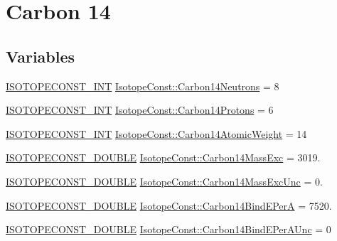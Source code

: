 \hypertarget{group___isotope_const-_carbon-_c14}{}\section{Carbon 14}
\label{group___isotope_const-_carbon-_c14}
\subsection*{Variables}
\begin{DoxyCompactItemize}
\item 
\mbox{\hyperlink{group___isotope_const-_macros_ga5f18360b3e99483a35c32d789e62621c}{I\+S\+O\+T\+O\+P\+E\+C\+O\+N\+S\+T\+\_\+\+I\+NT}} \mbox{\hyperlink{group___isotope_const-_carbon-_c14_ga27dacc948f6ae06a5991ff37f7dabc4e}{Isotope\+Const\+::\+Carbon14\+Neutrons}} = 8
\item 
\mbox{\hyperlink{group___isotope_const-_macros_ga5f18360b3e99483a35c32d789e62621c}{I\+S\+O\+T\+O\+P\+E\+C\+O\+N\+S\+T\+\_\+\+I\+NT}} \mbox{\hyperlink{group___isotope_const-_carbon-_c14_gaa3de74dac29f99d58605443dff6628bf}{Isotope\+Const\+::\+Carbon14\+Protons}} = 6
\item 
\mbox{\hyperlink{group___isotope_const-_macros_ga5f18360b3e99483a35c32d789e62621c}{I\+S\+O\+T\+O\+P\+E\+C\+O\+N\+S\+T\+\_\+\+I\+NT}} \mbox{\hyperlink{group___isotope_const-_carbon-_c14_ga43cebc563dcf6e3277e051b9c78b7fba}{Isotope\+Const\+::\+Carbon14\+Atomic\+Weight}} = 14
\item 
\mbox{\hyperlink{group___isotope_const-_macros_ga8f45a7272ce02c0b4c65c44636ed719a}{I\+S\+O\+T\+O\+P\+E\+C\+O\+N\+S\+T\+\_\+\+D\+O\+U\+B\+LE}} \mbox{\hyperlink{group___isotope_const-_carbon-_c14_gab3c2e9a1a8831126615196a547a62341}{Isotope\+Const\+::\+Carbon14\+Mass\+Exc}} = 3019.
\item 
\mbox{\hyperlink{group___isotope_const-_macros_ga8f45a7272ce02c0b4c65c44636ed719a}{I\+S\+O\+T\+O\+P\+E\+C\+O\+N\+S\+T\+\_\+\+D\+O\+U\+B\+LE}} \mbox{\hyperlink{group___isotope_const-_carbon-_c14_ga42c4f9dd8ca8780d6553556cb70a1f9d}{Isotope\+Const\+::\+Carbon14\+Mass\+Exc\+Unc}} = 0.
\item 
\mbox{\hyperlink{group___isotope_const-_macros_ga8f45a7272ce02c0b4c65c44636ed719a}{I\+S\+O\+T\+O\+P\+E\+C\+O\+N\+S\+T\+\_\+\+D\+O\+U\+B\+LE}} \mbox{\hyperlink{group___isotope_const-_carbon-_c14_ga304f2e8dbe0fe4304e99a1efd5a7b66b}{Isotope\+Const\+::\+Carbon14\+Bind\+E\+PerA}} = 7520.
\item 
\mbox{\hyperlink{group___isotope_const-_macros_ga8f45a7272ce02c0b4c65c44636ed719a}{I\+S\+O\+T\+O\+P\+E\+C\+O\+N\+S\+T\+\_\+\+D\+O\+U\+B\+LE}} \mbox{\hyperlink{group___isotope_const-_carbon-_c14_ga136d41211dbfe6e7ebc64fb72d388819}{Isotope\+Const\+::\+Carbon14\+Bind\+E\+Per\+A\+Unc}} = 0

\end{DoxyCompactItemize}
